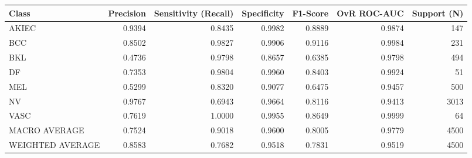 \begin{tabular}{lrrrrrr}
\toprule
Class & Precision & Sensitivity (Recall) & Specificity & F1-Score & OvR ROC-AUC & Support (N) \\
\midrule
AKIEC & 0.9394 & 0.8435 & 0.9982 & 0.8889 & 0.9874 & 147 \\
BCC & 0.8502 & 0.9827 & 0.9906 & 0.9116 & 0.9984 & 231 \\
BKL & 0.4736 & 0.9798 & 0.8657 & 0.6385 & 0.9798 & 494 \\
DF & 0.7353 & 0.9804 & 0.9960 & 0.8403 & 0.9924 & 51 \\
MEL & 0.5299 & 0.8320 & 0.9077 & 0.6475 & 0.9457 & 500 \\
NV & 0.9767 & 0.6943 & 0.9664 & 0.8116 & 0.9413 & 3013 \\
VASC & 0.7619 & 1.0000 & 0.9955 & 0.8649 & 0.9999 & 64 \\
MACRO AVERAGE & 0.7524 & 0.9018 & 0.9600 & 0.8005 & 0.9779 & 4500 \\
WEIGHTED AVERAGE & 0.8583 & 0.7682 & 0.9518 & 0.7831 & 0.9519 & 4500 \\
\bottomrule
\end{tabular}
